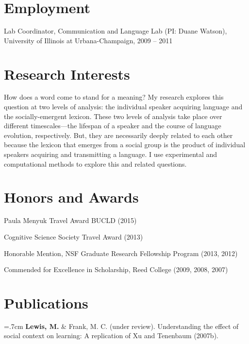 \documentclass[letterpaper]{article}
\renewenvironment{itemize}{
  \begin{list}{}{
    \setlength{\leftmargin}{1.5em}
  }
}{
  \end{list}
}
\begin{document}
\section*{Employment}

\begin{itemize}
\item Lab Coordinator, Communication and Language Lab (PI: Duane Watson), University of Illinois at Urbana-Champaign,  2009 -- 2011

\end{itemize}

\section*{Research Interests}

How does a word come to stand for a meaning? My research explores this question at two levels of analysis: the individual speaker acquiring language and the socially-emergent lexicon. These two levels of analysis take place over different timescales---the lifespan of a speaker and the course of language evolution, respectively. But, they are necessarily deeply related to each other because the lexicon that emerges from a social group is the product of individual speakers acquiring and transmitting a language. I use experimental and computational methods to explore this and related questions.
		

\section*{ Honors and Awards}
\begin{itemize}
\item  Paula Menyuk Travel Award BUCLD (2015)
\item Cognitive Science Society Travel Award (2013)
\item Honorable Mention, NSF Graduate Research Fellowship Program (2013, 2012)
\item Commended for Excellence in Scholarship, Reed College (2009, 2008, 2007)
\end{itemize}

\section*{Publications}

  \hangindent=.7cm {\bf Lewis, M.} \& Frank, M. C. (under review). Understanding the effect of social context on learning: A replication of Xu and Tenenbaum (2007b).
\end{document}
